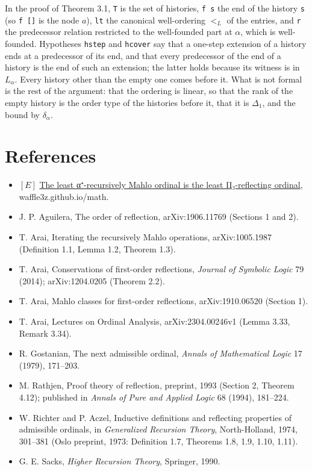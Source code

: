 \documentclass[11pt]{article}
\begin{document}
In the proof of Theorem 3.1, \texttt{T} is the set of histories, \texttt{f s} the end of the
history \texttt{s} (so \texttt{f []} is the node $a$), \texttt{lt} the canonical well-ordering $<_L$ of the entries,
and \texttt{r} the predecessor relation restricted to the well-founded part at $\alpha$, which is well-founded.
Hypotheses \texttt{hstep} and \texttt{hcover} say that a one-step extension of a history ends at a predecessor of its
end, and that every predecessor of the end of a history is the end of such an extension; the latter holds because its
witness is in $L_\alpha$. Every history other than the empty one comes before it. What is not formal is the rest of
the argument: that the ordering is linear, so that the rank of the empty history is the order type of the histories
before it, that it is $\Delta_1$, and the bound by $\delta_\alpha$.

\section*{References}

\begin{itemize}
\item $[E]$ \href{https://waffle3z.github.io/math/greatly-mahlo-pi3.html}{The least α⁺-recursively Mahlo ordinal is the least Π₃-reflecting ordinal},
  waffle3z.github.io/math.
\item J. P. Aguilera, The order of reflection, arXiv:1906.11769 (Sections 1 and 2).
\item T. Arai, Iterating the recursively Mahlo operations, arXiv:1005.1987 (Definition 1.1, Lemma 1.2, Theorem 1.3).
\item T. Arai, Conservations of first-order reflections, \emph{Journal of Symbolic Logic} 79 (2014); arXiv:1204.0205
  (Theorem 2.2).
\item T. Arai, Mahlo classes for first-order reflections, arXiv:1910.06520 (Section 1).
\item T. Arai, Lectures on Ordinal Analysis, arXiv:2304.00246v1 (Lemma 3.33, Remark 3.34).
\item R. Gostanian, The next admissible ordinal, \emph{Annals of Mathematical Logic} 17 (1979), 171--203.
\item M. Rathjen, Proof theory of reflection, preprint, 1993 (Section 2, Theorem 4.12); published in
  \emph{Annals of Pure and Applied Logic} 68 (1994), 181--224.
\item W. Richter and P. Aczel, Inductive definitions and reflecting properties of admissible ordinals, in
  \emph{Generalized Recursion Theory}, North-Holland, 1974, 301--381 (Oslo preprint, 1973: Definition 1.7, Theorems 1.8,
  1.9, 1.10, 1.11).
\item G. E. Sacks, \emph{Higher Recursion Theory}, Springer, 1990.
\end{itemize}
\end{document}
